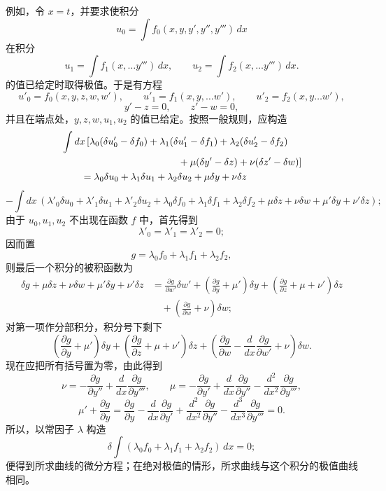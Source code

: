 \documentclass[11pt,a4paper,leqno]{article}
\begin{document}
例如，令 $x=t$，并要求使积分
\[
u_0=\int f_0(x,y,y',y'',y''')\,dx
\]
在积分
\[
u_1=\int f_1(x,\ldots y''')\,dx,\qquad
u_2=\int f_2(x,\ldots y''')\,dx.
\]
的值已给定时取得极值。于是有方程
\[
u'_0=f_0(x,y,z,w,w'),\qquad
u'_1=f_1(x,y,\ldots w'),\qquad
u'_2=f_2(x,y\ldots w'),
\]
\[
y'-z=0,\qquad z'-w=0,
\]
并且在端点处，$y,z,w,u_1,u_2$ 的值已给定。按照一般规则，应构造
\[
\begin{aligned}
&\int dx\,[\lambda_0(\delta u'_0-\delta f_0)
+\lambda_1(\delta u'_1-\delta f_1)
+\lambda_2(\delta u'_2-\delta f_2)\\
&\hspace{42mm}+\mu(\delta y'-\delta z)+\nu(\delta z'-\delta w)]\\
&\qquad=\lambda_0\delta u_0+\lambda_1\delta u_1+\lambda_2\delta u_2+\mu\delta y+\nu\delta z
\end{aligned}
\]
\[
-\int dx\,(\lambda'_0\delta u_0+\lambda'_1\delta u_1+\lambda'_2\delta u_2
+\lambda_0\delta f_0+\lambda_1\delta f_1+\lambda_2\delta f_2
+\mu\delta z+\nu\delta w+\mu'\delta y+\nu'\delta z);
\]
由于 $u_0,u_1,u_2$ 不出现在函数 $f$ 中，首先得到
\[
\lambda'_0=\lambda'_1=\lambda'_2=0;
\]
因而置
\[
g=\lambda_0f_0+\lambda_1f_1+\lambda_2f_2,
\]
则最后一个积分的被积函数为
\[
\begin{aligned}
\delta g+\mu\delta z+\nu\delta w+\mu'\delta y+\nu'\delta z
&=\frac{\partial g}{\partial w'}\delta w'
+\left(\frac{\partial g}{\partial y}+\mu'\right)\delta y
+\left(\frac{\partial g}{\partial z}+\mu+\nu'\right)\delta z\\
&\quad+\left(\frac{\partial g}{\partial w}+\nu\right)\delta w;
\end{aligned}
\]
对第一项作分部积分，积分号下剩下
\[
\left(\frac{\partial g}{\partial y}+\mu'\right)\delta y
+\left(\frac{\partial g}{\partial z}+\mu+\nu'\right)\delta z
+\left(\frac{\partial g}{\partial w}-\frac{d}{dx}\frac{\partial g}{\partial w'}+\nu\right)\delta w.
\]
现在应把所有括号置为零，由此得到
\[
\nu=-\frac{\partial g}{\partial y''}+\frac{d}{dx}\frac{\partial g}{\partial y'''},\qquad
\mu=-\frac{\partial g}{\partial y'}+\frac{d}{dx}\frac{\partial g}{\partial y''}
-\frac{d^2}{dx^2}\frac{\partial g}{\partial y'''},
\]
\[
\mu'+\frac{\partial g}{\partial y}
=\frac{\partial g}{\partial y}-\frac{d}{dx}\frac{\partial g}{\partial y'}
+\frac{d^2}{dx^2}\frac{\partial g}{\partial y''}
-\frac{d^3}{dx^3}\frac{\partial g}{\partial y'''}=0.
\]
所以，以常因子 $\lambda$ 构造
\[
\delta\int(\lambda_0f_0+\lambda_1f_1+\lambda_2f_2)\,dx=0;
\]
便得到所求曲线的微分方程；在绝对极值的情形，所求曲线与这个积分的极值曲线相同。
\end{document}
